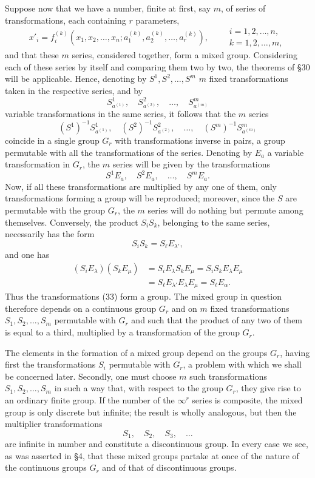 \documentclass[11pt]{book}
\begin{document}
Suppose now that we have a number, finite at first, say $m$, of series of transformations, each containing $r$ parameters,
\[
 x'_i=f_i^{(k)}(x_1,x_2,\ldots,x_n; a_1^{(k)},a_2^{(k)},\ldots,a_r^{(k)}),
 \qquad
 \begin{gathered}
 i=1,2,\ldots,n,\\
 k=1,2,\ldots,m,
 \end{gathered}
\]
and that these $m$ series, considered together, form a mixed group. Considering each of these series by itself and comparing them two by two, the theorems of \S{}30 will be applicable. Hence, denoting by $S^1,S^2,\ldots,S^m$ $m$ fixed transformations taken in the respective series, and by
\[
 S_{a^{(1)}}^1,
 \quad S_{a^{(2)}}^2,
 \quad \ldots,
 \quad S_{a^{(m)}}^m
\]
variable transformations in the same series, it follows that the $m$ series
\[
 (S^1)^{-1}S_{a^{(1)}}^1,
 \quad (S^2)^{-1}S_{a^{(2)}}^2,
 \quad \ldots,
 \quad (S^m)^{-1}S_{a^{(m)}}^m
\]
coincide in a single group $G_r$ with transformations inverse in pairs, a group permutable with all the transformations of the series. Denoting by $E_a$ a variable transformation in $G_r$, the $m$ series will be given by the transformations
\begin{equation*}\tag{33}
 S^1E_a,
 \quad S^2E_a,
 \quad \ldots,
 \quad S^mE_a.
\end{equation*}
Now, if all these transformations are multiplied by any one of them, only transformations forming a group will be reproduced; moreover, since the $S$ are permutable with the group $G_r$, the $m$ series will do nothing but permute among themselves. Conversely, the product $S_iS_k$, belonging to the same series, necessarily has the form
\[
 S_iS_k=S_\ell E_{\lambda'},
\]
and one has
\[
\begin{split}
 (S_iE_\lambda)(S_kE_\mu)
  &=S_iE_\lambda S_kE_\mu
   =S_iS_kE_\lambda E_\mu       \\
  &=S_\ell E_{\lambda'}E_\lambda E_\mu
   =S_\ell E_\alpha.
\end{split}
\]
Thus the transformations (33) form a group. The mixed group in question therefore depends on a continuous group $G_r$ and on $m$ fixed transformations $S_1,S_2,\ldots,S_m$ permutable with $G_r$ and such that the product of any two of them is equal to a third, multiplied by a transformation of the group $G_r$.

The elements in the formation of a mixed group depend on the groups $G_r$, having first the transformations $S_i$ permutable with $G_r$, a problem with which we shall be concerned later. Secondly, one must choose $m$ such transformations $S_1,S_2,\ldots,S_m$ in such a way that, with respect to the group $G_r$, they give rise to an ordinary finite group. If the number of the $\infty^r$ series is composite, the mixed group is only discrete but infinite; the result is wholly analogous, but then the multiplier transformations
\[
 S_1,
 \quad S_2,
 \quad S_3,
 \quad \ldots
\]
are infinite in number and constitute a discontinuous group. In every case we see, as was asserted in \S{}4, that these mixed groups partake at once of the nature of the continuous groups $G_r$ and of that of discontinuous groups.
\end{document}
